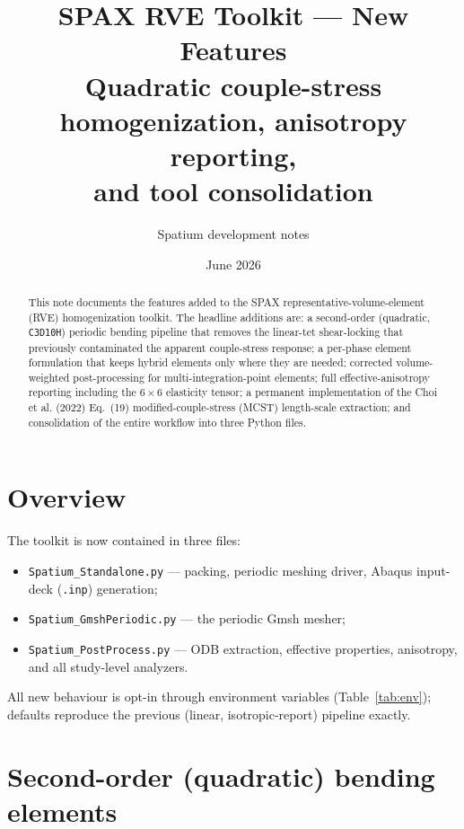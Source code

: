 \documentclass[11pt]{article}
\title{\textbf{SPAX RVE Toolkit --- New Features}\\[2pt]
\large Quadratic couple-stress homogenization, anisotropy reporting,\\
and tool consolidation}
\author{Spatium development notes}
\date{June 2026}
\newcommand{\code}[1]{\texttt{\small #1}}
\begin{document}
\maketitle

\begin{abstract}
This note documents the features added to the SPAX representative-volume-element
(RVE) homogenization toolkit. The headline additions are: a second-order
(quadratic, \code{C3D10H}) periodic bending pipeline that removes the linear-tet
shear-locking that previously contaminated the apparent couple-stress response;
a per-phase element formulation that keeps hybrid elements only where they are
needed; corrected volume-weighted post-processing for multi-integration-point
elements; full effective-anisotropy reporting including the $6{\times}6$
elasticity tensor; a permanent implementation of the Choi et al. (2022) Eq.~(19)
modified-couple-stress (MCST) length-scale extraction; and consolidation of the
entire workflow into three Python files.
\end{abstract}

\tableofcontents

\section{Overview}
The toolkit is now contained in three files:
\begin{itemize}[nosep]
  \item \code{Spatium\_Standalone.py} --- packing, periodic meshing driver,
        Abaqus input-deck (\code{.inp}) generation;
  \item \code{Spatium\_GmshPeriodic.py} --- the periodic Gmsh mesher;
  \item \code{Spatium\_PostProcess.py} --- ODB extraction, effective properties,
        anisotropy, and all study-level analyzers.
\end{itemize}
All new behaviour is opt-in through environment variables (Table~\ref{tab:env});
defaults reproduce the previous (linear, isotropic-report) pipeline exactly.

\section{Second-order (quadratic) bending elements}
\label{sec:quad}
\end{document}
